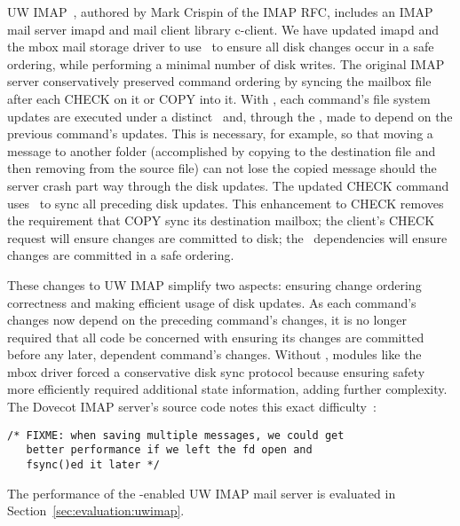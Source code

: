 UW IMAP~\cite{uwimap}, authored by Mark Crispin of the IMAP RFC,
includes an IMAP mail server imapd and mail client library c-client.
We have updated imapd and the mbox mail storage driver to use
\opgroups\ to ensure all disk changes occur in a safe ordering, while
performing a minimal number of disk writes.
%
The original IMAP server conservatively preserved command ordering by
syncing the mailbox file after each CHECK on it or COPY into it. With
\opgroups, each command's file system updates are executed under a
distinct \opgroup\ and, through the \opgroup, made to depend on the
previous command's updates. This is necessary, for example, so that
moving a message to another folder (accomplished by copying to the
destination file and then removing from the source file) can not lose
the copied message should the server crash part way through the disk
updates.
%
The updated CHECK command uses \pgSync\ to sync all preceding disk
updates. This enhancement to CHECK removes the requirement that COPY
sync its destination mailbox; the client's CHECK request will ensure
changes are committed to disk; the \opgroup\ dependencies will ensure
changes are committed in a safe ordering.

These changes to UW IMAP simplify two aspects:
%
ensuring change ordering correctness
%
and making efficient usage of disk updates.
%
As each command's changes now depend on the preceding command's
changes, it is no longer required that all code be concerned with
ensuring its changes are committed before any later, dependent
command's changes. Without \opgroups, modules like the mbox driver
forced a conservative disk sync protocol because ensuring safety more
efficiently required additional state information, adding further
complexity. The Dovecot IMAP server's source code notes this exact
difficulty~\cite[maildir-save.c]{dovecot}:

\vspace{-0.5\baselineskip}
\begin{scriptsize}
\begin{verbatim}
/* FIXME: when saving multiple messages, we could get
   better performance if we left the fd open and
   fsync()ed it later */
\end{verbatim}
\end{scriptsize}
\vspace{-0.5\baselineskip}

The performance of the \opgroup{}-enabled UW IMAP mail server is
evaluated in Section~\ref{sec:evaluation:uwimap}.
